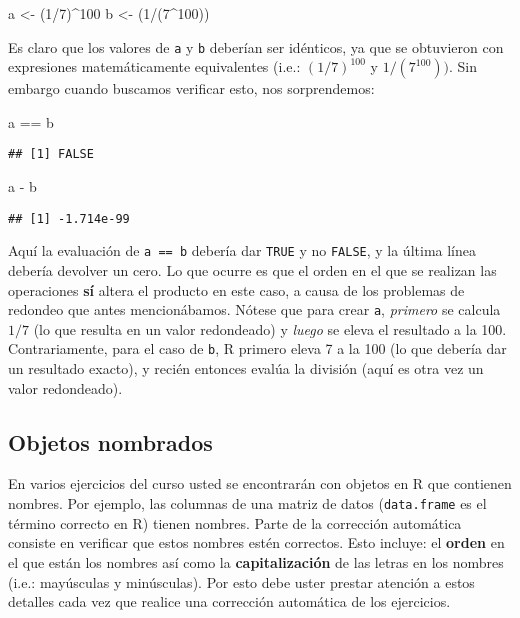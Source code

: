 \documentclass[]{article}
\newenvironment{Shaded}{}{}
\newcommand{\DecValTok}[1]{\textcolor[rgb]{0.25,0.63,0.44}{{#1}}}
\newcommand{\NormalTok}[1]{{#1}}
\begin{document}
\begin{Shaded}
\begin{Highlighting}[]
\NormalTok{a <- (}\DecValTok{1}\NormalTok{/}\DecValTok{7}\NormalTok{)^}\DecValTok{100}
\NormalTok{b <- (}\DecValTok{1}\NormalTok{/(}\DecValTok{7}\NormalTok{^}\DecValTok{100}\NormalTok{))}
\end{Highlighting}
\end{Shaded}
Es claro que los valores de \texttt{a} y \texttt{b} deberían ser
idénticos, ya que se obtuvieron con expresiones matemáticamente
equivalentes (i.e.: $(1 / 7) ^ {100}$ y $1 / (7 ^ {100}))$. Sin embargo
cuando buscamos verificar esto, nos sorprendemos:

\begin{Shaded}
\begin{Highlighting}[]
\NormalTok{a == b}
\end{Highlighting}
\end{Shaded}
\begin{verbatim}
## [1] FALSE
\end{verbatim}
\begin{Shaded}
\begin{Highlighting}[]
\NormalTok{a - b}
\end{Highlighting}
\end{Shaded}
\begin{verbatim}
## [1] -1.714e-99
\end{verbatim}
Aquí la evaluación de \texttt{a == b} debería dar \texttt{TRUE} y no
\texttt{FALSE}, y la última línea debería devolver un cero. Lo que
ocurre es que el orden en el que se realizan las operaciones \textbf{sí}
altera el producto en este caso, a causa de los problemas de redondeo
que antes mencionábamos. Nótese que para crear \texttt{a},
\emph{primero} se calcula $1/7$ (lo que resulta en un valor redondeado)
y \emph{luego} se eleva el resultado a la 100. Contrariamente, para el
caso de \texttt{b}, R primero eleva 7 a la 100 (lo que debería dar un
resultado exacto), y recién entonces evalúa la división (aquí es otra
vez un valor redondeado).

\subsection{Objetos nombrados}

En varios ejercicios del curso usted se encontrarán con objetos en R que
contienen nombres. Por ejemplo, las columnas de una matriz de datos
(\texttt{data.frame} es el término correcto en R) tienen nombres. Parte
de la corrección automática consiste en verificar que estos nombres
estén correctos. Esto incluye: el \textbf{orden} en el que están los
nombres así como la \textbf{capitalización} de las letras en los nombres
(i.e.: mayúsculas y minúsculas). Por esto debe uster prestar atención a
estos detalles cada vez que realice una corrección automática de los
ejercicios.
\end{document}

